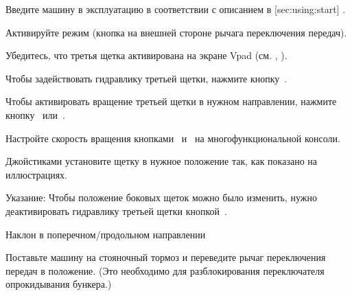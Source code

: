 \stopsection






\startsection [title={Работа с третьей щеткой (опция)},
reference={sec:using:frontBrush},
]

\startSteps
\item Введите машину в эксплуатацию в соответствии с описанием в [sec:using:start] .
\item Активируйте  режим (кнопка на внешней стороне рычага переключения передач).
\stopSteps


\startSteps [continue]
\item Убедитесь, что третья щетка активирована на экране Vpad (см.  , ).
\item Чтобы задействовать гидравлику третьей щетки, нажмите кнопку~.
\item Чтобы активировать вращение третьей щетки в нужном направлении, нажмите кнопку~ или~.

\item Настройте скорость вращения кнопками~ и~ на многофункциональной консоли.

\item Джойстиками установите щетку в нужное положение так, как показано на иллюстрациях.

\stopSteps

{\md Указание:} {\lt Чтобы положение боковых щеток можно было изменить, нужно деактивировать гидравлику третьей щетки кнопкой~.}
\vfill

\start
\setupcombinations [width=\textwidth]

{
{}{Наклон в поперечном/продольном направлении}
\stopcombination}
\stop



\stopsection



\item Поставьте машину на стояночный тормоз и переведите рычаг переключения передач в  положение. (Это необходимо для разблокирования переключателя опрокидывания бункера.)


